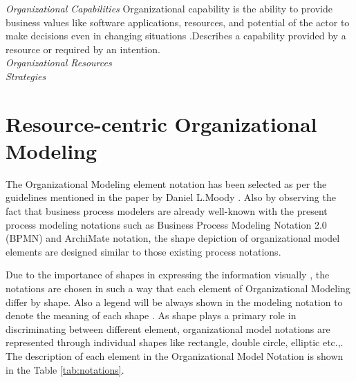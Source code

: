 \textit{Organizational Capabilities} Organizational capability is the ability to provide business values like software applications, resources, and potential of the actor to make decisions even in changing situations \cite{Stirna2012}.Describes a capability provided by a resource or required by an intention.    \\



\textit{Organizational Resources}         \\


\textit{Strategies}         \\




\section{Resource-centric Organizational Modeling}
 The Organizational Modeling element notation has been selected as per the guidelines mentioned in the paper by Daniel L.Moody \cite{Moody2009}. Also by observing  the fact that business process modelers are already well-known with the present process modeling notations such as Business Process Modeling Notation 2.0 (BPMN) \cite{bpm2011} and ArchiMate notation\cite{arc2013}, the shape depiction of organizational model elements are designed similar to those existing process notations. 

 Due to the importance of shapes in expressing the information visually , the notations are chosen in such a way that each element of Organizational Modeling  differ by shape. Also a legend will be always shown in the modeling notation to denote the meaning of each shape \cite{Moody2009}. As shape plays a primary role in discriminating between different element, organizational model notations are represented through individual shapes like rectangle, double circle, elliptic etc.,. The description of each element in the Organizational Model Notation is shown in the Table \ref{tab:notations}. 

